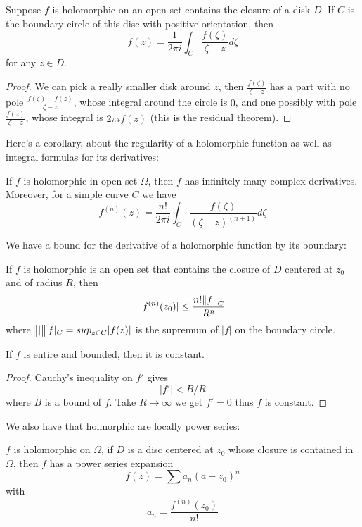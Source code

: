 \documentclass[main.tex]{subfiles}
\begin{document}
\begin{theorem}
Suppose $f$ is holomorphic on an open set contains the closure of a disk $D$. If $C$ is the boundary circle of this disc with positive orientation, then
$$
f(z) = \frac{1}{2\pi i} \int_C \frac{f(\zeta)}{\zeta - z} d\zeta
$$
for any $z \in D$.
\end{theorem}

\begin{proof}
We can pick a really smaller disk around $z$, then $\frac{f(\zeta)}{\zeta - z}$ has a part with no pole $\frac{f(\zeta) - f(z)}{\zeta - z}$, whose integral around the circle is $0$, and one possibly with pole $\frac{f(z)}{\zeta - z}$, whose integral is $2\pi i f(z)$ (this is the residual theorem).
\end{proof}

Here's a corollary, about the regularity of a holomorphic function as well as integral formulas for its derivatives:

\begin{corollary} 
If $f$ is holomorphic in open set $\Omega$, then $f$ has infinitely many complex derivatives. Moreover, for a simple curve $C$ we have 
$$
f^{(n)}(z) = \frac{n!}{2\pi i} \int_C \frac{f(\zeta)}{(\zeta - z)^{(n+1)}} d\zeta
$$
\end{corollary}

We have a bound for the derivative of a holomorphic function by its boundary:
\begin{corollary}
If $f$ is holomorphic is an open set that contains the closure of $D$ centered at $z_0$ and of radius $R$, then 
$$
|f^{(n)} (z_0)| \leq \frac{n! \norm{f}_C}{R^n}
$$
where $\norm|f|_C = sup_{z \in C}|f(z)|$ is the supremum of $|f|$ on the boundary circle.
\end{corollary}

\begin{corollary}
If $f$ is entire and bounded, then it is constant.
\end{corollary}
\begin{proof}
Cauchy's inequality on $f'$ gives 
$$
|f'| < B/R
$$
where $B$ is a bound of $f$. Take $R \rightarrow \infty$ we get $f' = 0$ thus $f$ is constant. 
\end{proof}

We also have that holmorphic are locally power series:

\begin{theorem}
$f$ is holomorphic on $\Omega$, if $D$ is a disc centered at $z_0$ whose closure is contained in $\Omega$, then $f$ has a power series expansion
$$
f(z) = \sum a_n (a - z_0)^n
$$
with 
$$
a_n = \frac{f^{(n)}(z_0)}{n!}
$$
\end{theorem}
\end{document}
